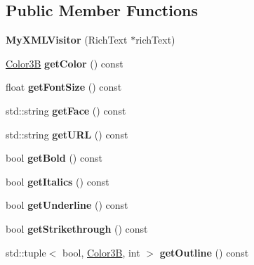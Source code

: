 \subsection*{Public Member Functions}
\begin{DoxyCompactItemize}
\item 
\mbox{\label{classMyXMLVisitor_a56b8607b7e816dfcf5a2eaeb56e664df}} 
{\bfseries My\+X\+M\+L\+Visitor} (Rich\+Text $\ast$rich\+Text)
\item 
\mbox{\label{classMyXMLVisitor_a6861b2431540f01a29d3e4b4902127ca}} 
\hyperlink{structColor3B}{Color3B} {\bfseries get\+Color} () const
\item 
\mbox{\label{classMyXMLVisitor_a1402af12b242f2bb0fe1a3f32df3421f}} 
float {\bfseries get\+Font\+Size} () const
\item 
\mbox{\label{classMyXMLVisitor_a77d4316337823fec2e63774aeef40150}} 
std\+::string {\bfseries get\+Face} () const
\item 
\mbox{\label{classMyXMLVisitor_a29f0af6573fa9b974c2232ea6bdc83d1}} 
std\+::string {\bfseries get\+U\+RL} () const
\item 
\mbox{\label{classMyXMLVisitor_acd0f683d0915d2d2329caeb15547c8fc}} 
bool {\bfseries get\+Bold} () const
\item 
\mbox{\label{classMyXMLVisitor_a4c0a19b1cb58c2c97d86439dd22722a5}} 
bool {\bfseries get\+Italics} () const
\item 
\mbox{\label{classMyXMLVisitor_aaf8db99a90b26f2f0860bb7b70f178c9}} 
bool {\bfseries get\+Underline} () const
\item 
\mbox{\label{classMyXMLVisitor_af5f729532b53b9c5ee03e544da2897a4}} 
bool {\bfseries get\+Strikethrough} () const
\item 
\mbox{\label{classMyXMLVisitor_a6cd53775cf6a131eb74f6d1f8563a518}} 
std\+::tuple$<$ bool, \hyperlink{structColor3B}{Color3B}, int $>$ {\bfseries get\+Outline} () const
\item 

\end{DoxyCompactItemize}
